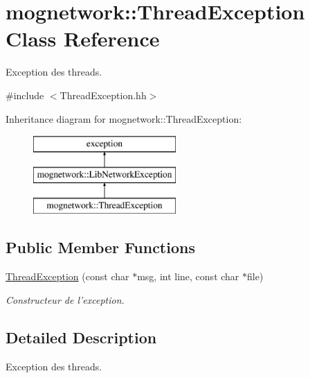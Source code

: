 \hypertarget{classmognetwork_1_1_thread_exception}{\section{mognetwork\-:\-:Thread\-Exception Class Reference}
\label{classmognetwork_1_1_thread_exception}
}


Exception des threads.  




{\ttfamily \#include $<$Thread\-Exception.\-hh$>$}

Inheritance diagram for mognetwork\-:\-:Thread\-Exception\-:\begin{figure}[H]
\begin{center}
\leavevmode
\includegraphics[height=3.000000cm]{classmognetwork_1_1_thread_exception}
\end{center}
\end{figure}
\subsection*{Public Member Functions}
\begin{DoxyCompactItemize}
\item 
\hyperlink{classmognetwork_1_1_thread_exception_a0f8e6b5811c083a0a656e9075fb53674}{Thread\-Exception} (const char $\ast$msg, int line, const char $\ast$file)
\begin{DoxyCompactList}\small\item\em Constructeur de l'exception. \end{DoxyCompactList}\end{DoxyCompactItemize}


\subsection{Detailed Description}
Exception des threads. 

